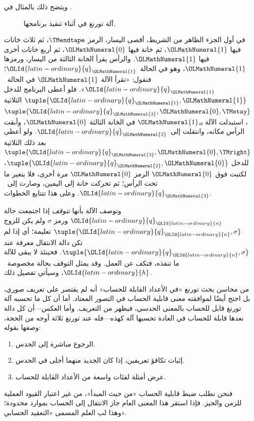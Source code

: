 \documentclass[../../../include/open-logic-section]{subfiles}
\begin{document}
\begin{explain}
ويتضح ذلك بالمثال في .
\begin{figure}
  \caption{آلة تورنغ في أثناء تنفيذ برنامجها.}
\end{figure}
في أول الجزء الظاهر من الشريط، أقصى اليسار، الرمز $\TMendtape$، ثم ثلاث خانات فيها ${\OLMathNumeral{1}}$، ثم خانة فيها ${\OLMathNumeral{0}}$، ثم أربع خانات أخرى فيها ${\OLMathNumeral{1}}$. والرأس يقرأ الخانة الثالثة من اليسار، ورمزها ${\OLMathNumeral{1}}$، وهو في الحالة~${\OLId{latin-ordinary}{q}}_{\OLMathNumeral{1}}$؛ فنقول: «تقرأ الآلة ${\OLMathNumeral{1}}$ في الحالة~${\OLId{latin-ordinary}{q}}_{\OLMathNumeral{1}}$». فلو أعطى البرنامج للدخل $\tuple{{\OLId{latin-ordinary}{q}}_{\OLMathNumeral{1}},{\OLMathNumeral{1}}}$ الثلاثية $\tuple{{\OLId{latin-ordinary}{q}}_{\OLMathNumeral{2}},{\OLMathNumeral{0}},\TMstay}$، استبدلت الآلة بـ${\OLMathNumeral{1}}$ في الخانة الثالثة ${\OLMathNumeral{0}}$، وأبقت الرأس مكانه، وانتقلت إلى~${\OLId{latin-ordinary}{q}}_{\OLMathNumeral{2}}$. ولو أعطى بعد ذلك الثلاثية $\tuple{{\OLId{latin-ordinary}{q}}_{\OLMathNumeral{3}},{\OLMathNumeral{0}},\TMright}$ للدخل $\tuple{{\OLId{latin-ordinary}{q}}_{\OLMathNumeral{2}},{\OLMathNumeral{0}}}$، لكتبت فوق ${\OLMathNumeral{0}}$ الرمز ${\OLMathNumeral{0}}$ مرة أخرى، فلا يتغير ما تحت الرأس؛ ثم تحركت خانة إلى اليمين، وصارت إلى~${\OLId{latin-ordinary}{q}}_{\OLMathNumeral{3}}$. وعلى هذا تتتابع الخطوات.

وتوصف الآلة بأنها \emph{تتوقف} إذا اجتمعت حالة ${\OLId{latin-ordinary}{q}}_{\OLId{latin-ordinary}{n}}$ ورمز $\sigma$ ولم يكن للزوج $\tuple{{\OLId{latin-ordinary}{q}}_{\OLId{latin-ordinary}{n}},\sigma}$ تعليمة؛ أي إذا لم تكن دالة الانتقال معرفة عند $\tuple{{\OLId{latin-ordinary}{q}}_{\OLId{latin-ordinary}{n}},\sigma}$. فحينئذ لا يبقى للآلة ما تنفذه، فتكف عن العمل. وقد يمثل التوقف بحالة مخصوصة~${\OLId{latin-ordinary}{h}}$، وسيأتي تفصيل ذلك.
\end{explain}

\begin{digress}
من محاسن بحث تورنغ «في الأعداد القابلة للحساب» أنه لم يقتصر على تعريف صوري، بل احتج أيضًا لموافقته معنى قابلية الحساب في التصور المعتاد. أما أن كل ما تحسبه آلة تورنغ قابل للحساب بالمعنى الحدسي، فيظهر من التعريف. وأما العكس---أن كل دالة نعدها قابلة للحساب في العادة تحسبها آلة كهذه---فله عند تورنغ ثلاثة أوجه من الحجة، وصفها بقوله:
\begin{enumerate}
\item الرجوع مباشرة إلى الحدس.
\item إثبات تكافؤ تعريفين، إذا كان الجديد منهما أجلى في الحدس.
\item عرض أمثلة لفئات واسعة من الأعداد القابلة للحساب.
\end{enumerate}
فنحن نطلب ضبط قابلية الحساب «من حيث المبدأ»، من غير اعتبار القيود العملية للزمن والحيز. فإذا استقر هذا المعنى العام جاز الانتقال إلى الحساب بموارد محدودة؛ وهذا لب العلم المسمى «التعقيد الحسابي».
\end{digress}
\end{document}

